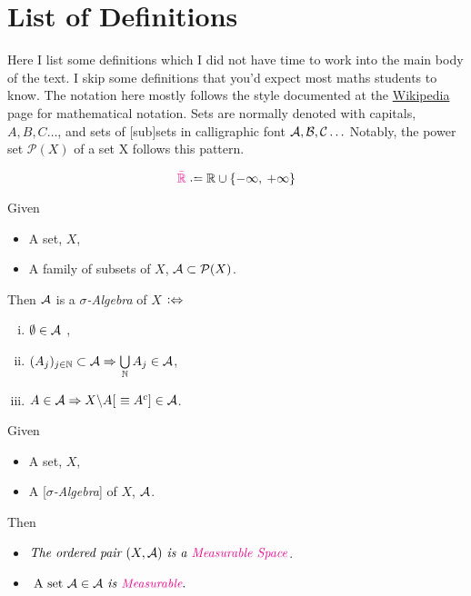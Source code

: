 
\section{List of Definitions}
Here I list some definitions which I did not have time to work into the main body of the text. I skip some definitions that you'd expect most maths students to know. The notation here mostly follows the style documented at the \href{https://en.wikipedia.org/wiki/List_of_mathematical_symbols}{Wikipedia} page for mathematical notation. Sets are normally denoted with capitals, $A, B, C\ldots$, and sets of [sub]sets in calligraphic font $\mathcal{A}, \mathcal{B}, \mathcal{C}\ldots$ Notably, the power set $\mathcal{P}(X)$ of a set X follows this pattern.

\begin{definition}\label{def:eRealLine}
$${\color{Magenta}\eR} \defeq \R \cup \{-\infty,\> +\infty\}$$
\end{definition}

\begin{definition}\label{def:salgebra}
Given
\begin{itemize}
\item
	A set, $X$,
\item
	A family of subsets of $X$, $\mathcal{A} \subset \mathcal{P}(X)$.
\end{itemize}
Then $\mathcal{A}$ is a {\color{Magenta}\emph{$\sigma$-Algebra}} of $X$ $\mathrel{\vcentcolon\Leftrightarrow}$
\begin{enumerate}[(i)]
\centering
\item
	$\emptyset \in \mathcal{A}$ \vspace{2pt},
\item
	$(A_j)_{j\in\mathbb{N}} \subset \mathcal{A} \Rightarrow \bigcup\limits_{\mathbb{N}} A_j \in \mathcal{A}$,
\item
	$A \in \mathcal{A} \Rightarrow  X\backslash{}A [\ \equiv A^c] \in \mathcal{A}$.
\end{enumerate}
\end{definition}

\begin{definition}\label{def:mablespace}
Given
\begin{itemize}
\item
	A set, $X$,
\item
	A [\emph{$\sigma$-Algebra}] of $X$, $\mathcal{A}$.
\end{itemize}
Then
\begin{itemize}
\item
	$\text{\it The ordered pair }(X, \A) \text{\it \ is a {\color{Magenta}Measurable Space}}$.
\item
	$\text{ A set }\A \in \A \text{\it\ is {\color{Magenta}Measurable}}.$
\end{itemize}
\end{definition}

